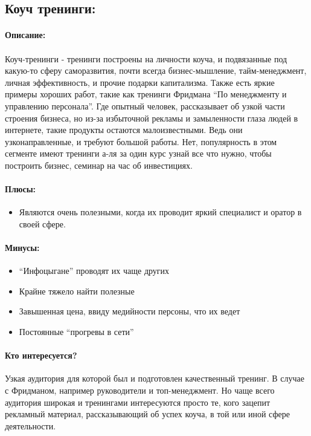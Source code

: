 \documentclass{article}
\begin{document}
\subsection{Коуч тренинги:}
\paragraph{\textbf{Описание:}}
\paragraph{}
Коуч-тренинги - тренинги построены на личности коуча, и подвязанные под какую-то сферу саморазвития, почти всегда бизнес-мышление, тайм-менеджмент, личная эффективность, и прочие подарки капитализма. Также есть яркие примеры хороших работ, такие как тренинги Фридмана “По менеджменту и управлению персонала”. Где опытный человек, рассказывает об узкой части строения бизнеса, но из-за избыточной рекламы и замыленности глаза людей в интернете, такие продукты остаются малоизвестными. Ведь они узконаправленные, и требуют большой работы. Нет, популярность в этом сегменте имеют тренинги а-ля за один курс узнай все что нужно, чтобы построить бизнес, семинар на час об инвестициях.
\paragraph{\textbf{Плюсы:}}
\begin{itemize}
    \item Являются очень полезными, когда их проводит яркий специалист и оратор в своей сфере.
\end{itemize}
\paragraph{\textbf{Минусы:}}
\begin{itemize}
    \item “Инфоцыгане” проводят их чаще других
    \item Крайне тяжело найти полезные
    \item Завышенная цена, ввиду медийности персоны, что их ведет
    \item Постоянные “прогревы в сети”
\end{itemize}
\paragraph{\textbf{Кто интересуется?}}
Узкая аудитория для которой был и подготовлен качественный тренинг. В случае с Фридманом, например руководители и топ-менеджмент. Но чаще всего аудитория широкая и тренингами интересуются просто те, кого зацепит рекламный материал, рассказывающий об успех коуча, в той или иной сфере деятельности. 
\end{document}
